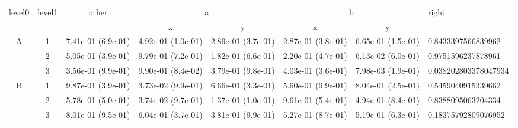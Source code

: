 \begin{tabular}{cccccccl}
\toprule
\multirow{2}{*}{level0} & \multirow{2}{*}{level1}& \multirow{2}{*}{other}&\multicolumn{2}{c}{a}&\multicolumn{2}{c}{b}& \multirow{2}{*}{right}\tabularnewline
\cmidrule(lr){4-5}
\cmidrule(lr){6-7}
&&&x&y&x&y\tabularnewline
\midrule
\multirow{3}{*}{A}&1& 7.41e-01 (6.9e-01)& 4.92e-01 (1.0e-01)& 2.89e-01 (3.7e-01)& 2.87e-01 (3.8e-01)& 6.65e-01 (1.5e-01)& 0.8433397566839962\tabularnewline
&2& 5.05e-01 (3.9e-01)& 9.79e-01 (7.2e-01)& 1.82e-01 (6.6e-01)& 2.20e-01 (4.7e-01)& 6.13e-02 (6.0e-01)& 0.9751596237878961\tabularnewline
&3& 3.56e-01 (9.9e-01)& 9.90e-01 (8.4e-02)& 3.79e-01 (9.8e-01)& 4.03e-01 (3.6e-01)& 7.98e-03 (1.9e-01)& 0.038202803378047934\tabularnewline
\midrule
\multirow{3}{*}{B}&1& 9.87e-01 (3.9e-01)& 3.73e-02 (9.9e-01)& 6.66e-01 (3.3e-01)& 5.60e-01 (9.9e-01)& 8.04e-01 (2.5e-01)& 0.5459040915339662\tabularnewline
&2& 5.78e-01 (5.0e-01)& 3.74e-02 (9.7e-01)& 1.37e-01 (1.0e-01)& 9.61e-01 (5.4e-01)& 4.94e-01 (8.4e-01)& 0.8388095063204334\tabularnewline
&3& 8.01e-01 (9.5e-01)& 6.04e-01 (3.7e-01)& 3.81e-01 (9.9e-01)& 5.27e-01 (8.7e-01)& 5.19e-01 (6.3e-01)& 0.18375792809076952\tabularnewline
\bottomrule
\end{tabular}
